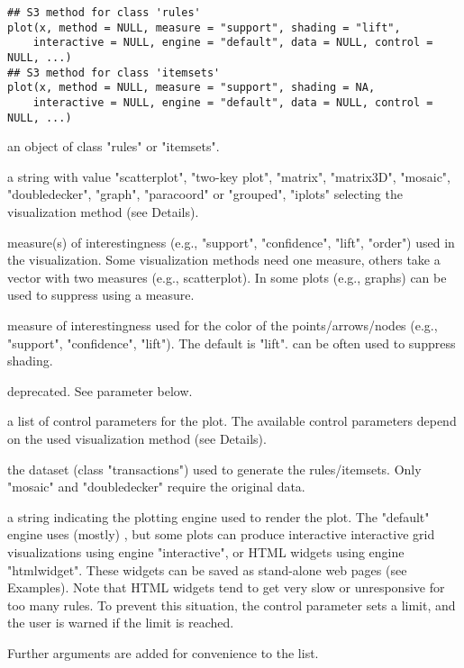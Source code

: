 \documentclass[letterpaper]{book}
\begin{document}
%
\begin{Usage}
\begin{verbatim}
## S3 method for class 'rules'
plot(x, method = NULL, measure = "support", shading = "lift", 
    interactive = NULL, engine = "default", data = NULL, control = NULL, ...)
## S3 method for class 'itemsets'
plot(x, method = NULL, measure = "support", shading = NA,
    interactive = NULL, engine = "default", data = NULL, control = NULL, ...)
\end{verbatim}
\end{Usage}
%
\begin{Arguments}
\begin{ldescription}
\item[\code{x}]  an object of class "rules" or "itemsets". 
\item[\code{method}]  a string with value "scatterplot", "two-key plot", "matrix", 
"matrix3D",  "mosaic", 
"doubledecker", "graph", "paracoord" or "grouped", "iplots" selecting the 
visualization method (see Details).

\item[\code{measure}]  measure(s) of interestingness 
(e.g., "support", "confidence", "lift", "order") used in the visualization. Some 
visualization methods need one measure, others take a vector with two 
measures (e.g., scatterplot). In some plots (e.g., graphs)  
can be used to suppress using a measure. 

\item[\code{shading}]  measure of interestingness used
for the color of the points/arrows/nodes
(e.g., "support", "confidence", "lift"). The default is "lift".
 can be often used to suppress shading.

\item[\code{interactive}]  deprecated. See parameter  below. 

\item[\code{control}]  a list of control parameters for the plot. The available
control parameters depend on the used visualization method (see Details).

\item[\code{data}]   the dataset (class "transactions") 
used to generate the rules/itemsets. Only 
"mosaic" and "doubledecker" require the original data.

\item[\code{engine}]  a string indicating the plotting engine used to 
render the plot. 
The "default" engine uses (mostly) , 
but some plots can produce interactive 
interactive grid visualizations using engine "interactive", or
HTML widgets using engine 
"htmlwidget". These widgets can be saved as stand-alone web pages 
(see Examples). Note that HTML widgets tend to get very slow 
or unresponsive for 
too many rules. To prevent this situation, the control parameter 
 sets a limit, and the user is warned if the limit is reached. 


\item[\code{...}]  Further arguments are added for convenience to the  list.
\end{ldescription}
\end{Arguments}
\end{document}
